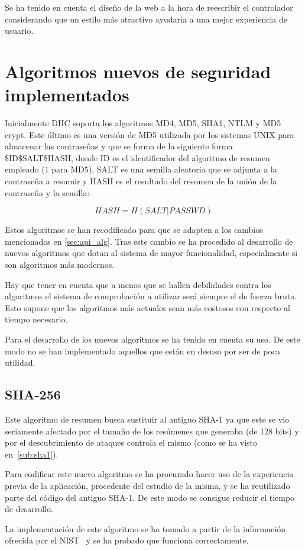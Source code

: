 Se ha tenido en cuenta el diseño de la web a la hora de reescribir el controlador considerando que un estilo más atractivo ayudaría a una mejor experiencia de usuario.

\section{Algoritmos nuevos de seguridad implementados}

Inicialmente DHC soporta los algoritmos MD4, MD5, SHA1, NTLM y MD5 crypt. Este último es una versión de MD5 utilizada por los sistemas UNIX para almacenar las contraseñas y que se forma de la siguiente forma \$ID\$SALT\$HASH, donde ID es el identificador del algoritmo de resumen empleado (1 para MD5), SALT es una semilla aleatoria que se adjunta a la contraseña a resumir y HASH es el resultado del resumen de la unión de la contraseña y la semilla:

$$HASH = H(SALT | PASSWD)$$

Estos algoritmos se han recodificado para que se adapten a los cambios mencionados en \ref{sec:api_alg}. Tras este cambio se ha procedido al desarrollo de nuevos algoritmos que dotan al sistema de mayor funcionalidad, especialmente si son algoritmos más modernos.

Hay que tener en cuenta que a menos que se hallen debilidades contra los algoritmos el sistema de comprobación a utilizar será siempre el de fuerza bruta. Esto supone que los algoritmos más actuales sean más costosos con respecto al tiempo necesario.

Para el desarrollo de los nuevos algoritmos se ha tenido en cuenta su uso. De este modo no se han implementado aquellos que están en desuso por ser de poca utilidad.

\subsection{SHA-256}

Este algoritmo de resumen busca sustituir al antiguo SHA-1 ya que este se vio seriamente afectado por el tamaño de los resúmenes que generaba (de 128 bits) y por el descubrimiento de ataques controla el mismo (como se ha visto en~\ref{sub:sha1}).

Para codificar este nuevo algoritmo se ha procurado hacer uso de la experiencia previa de la aplicación, procedente del estudio de la misma, y se ha reutilizado parte del código del antiguo SHA-1. De este modo se consigue reducir el tiempo de desarrollo.

La implementación de este algoritmo se ha tomado a partir de la información ofrecida por el NIST~\cite{nist:shs} y se ha probado que funciona correctamente.




